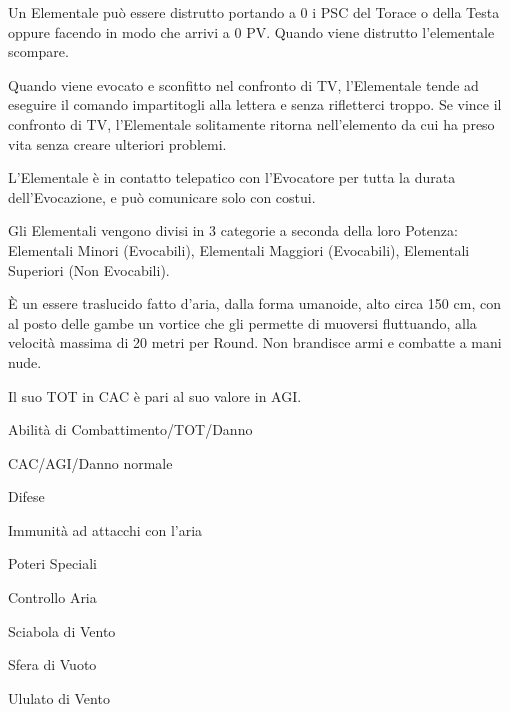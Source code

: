 Un Elementale pu\`o essere distrutto portando a 0 i PSC del Torace o
della Testa oppure facendo in modo che arrivi a 0 PV. Quando viene
distrutto l'elementale scompare.

Quando viene evocato e sconfitto nel confronto di TV, l'Elementale
tende ad eseguire il comando impartitogli alla lettera e senza
rifletterci troppo. Se vince il confronto di TV, l'Elementale
solitamente ritorna nell'elemento da cui ha preso vita senza creare
ulteriori problemi.

L'Elementale \`e in contatto telepatico con l'Evocatore per tutta
la durata dell'Evocazione, e pu\`o comunicare solo con costui.

Gli Elementali vengono divisi in 3 categorie a seconda della
loro Potenza: Elementali Minori (Evocabili), Elementali Maggiori
(Evocabili), Elementali Superiori (Non Evocabili).


\`E un essere traslucido fatto d'aria, dalla forma umanoide, alto
circa 150 cm, con al posto delle gambe un vortice che gli permette di
muoversi fluttuando, alla velocit\`a massima di 20 metri per Round.
Non brandisce armi e combatte a mani nude. 


Il suo TOT in CAC \`e pari al suo valore in AGI. 


\begin{parmostro}{Abilit\`a di Combattimento/TOT/Danno} 
\item CAC/AGI/Danno normale
\end{parmostro}

\begin{parmostro}{Difese} 
\item Immunit\`a ad attacchi con l'aria
\end{parmostro}

\begin{parmostro}{Poteri Speciali} 
\item Controllo Aria
\item Sciabola di Vento
\item Sfera di Vuoto
\item Ululato di Vento
\end{parmostro}


